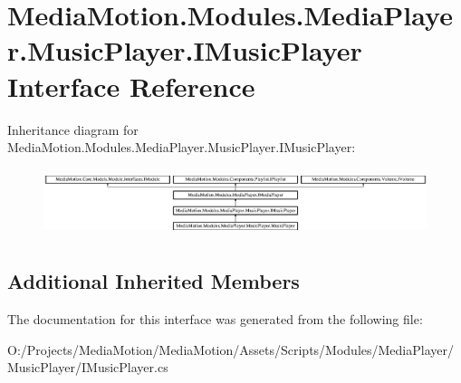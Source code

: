 \hypertarget{interface_media_motion_1_1_modules_1_1_media_player_1_1_music_player_1_1_i_music_player}{\section{Media\+Motion.\+Modules.\+Media\+Player.\+Music\+Player.\+I\+Music\+Player Interface Reference}
\label{interface_media_motion_1_1_modules_1_1_media_player_1_1_music_player_1_1_i_music_player}
}
Inheritance diagram for Media\+Motion.\+Modules.\+Media\+Player.\+Music\+Player.\+I\+Music\+Player\+:\begin{figure}[H]
\begin{center}
\leavevmode
\includegraphics[height=1.996435cm]{interface_media_motion_1_1_modules_1_1_media_player_1_1_music_player_1_1_i_music_player}
\end{center}
\end{figure}
\subsection*{Additional Inherited Members}


The documentation for this interface was generated from the following file\+:\begin{DoxyCompactItemize}
\item 
O\+:/\+Projects/\+Media\+Motion/\+Media\+Motion/\+Assets/\+Scripts/\+Modules/\+Media\+Player/\+Music\+Player/I\+Music\+Player.\+cs\end{DoxyCompactItemize}
